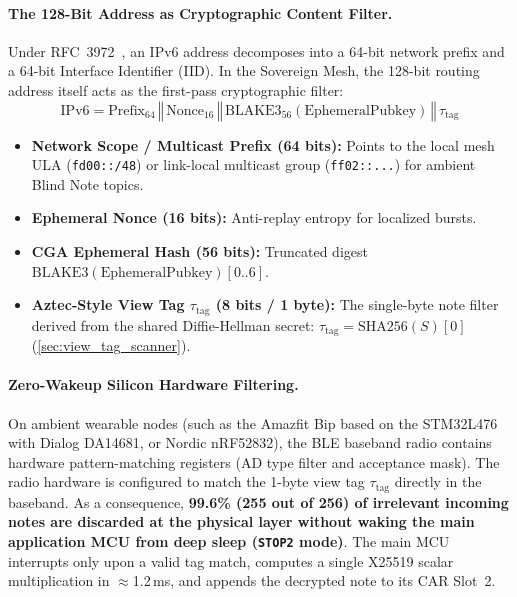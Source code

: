 \documentclass[a4paper,11pt,twoside,parskip=half-,headings=small]{scrartcl}
\newcommand{\code}[1]{\texttt{#1}}
\begin{document}
\paragraph{The 128-Bit Address as Cryptographic Content Filter.}
Under RFC~3972~\cite{rfc3972}, an IPv6 address decomposes into a 64-bit network prefix and a 64-bit Interface Identifier (IID). In the Sovereign Mesh, the 128-bit routing address itself acts as the first-pass cryptographic filter:
\begin{equation}
\text{IPv6} = \text{Prefix}_{64} \,\mathbin{\Vert}\, \text{Nonce}_{16} \,\mathbin{\Vert}\, \text{BLAKE3}_{56}(\text{EphemeralPubkey}) \,\mathbin{\Vert}\, \tau_{\text{tag}}
\end{equation}
\begin{itemize}[nosep]
  \item \textbf{Network Scope / Multicast Prefix (64 bits):} Points to the local mesh ULA (\code{fd00::/48}) or link-local multicast group (\code{ff02::...}) for ambient Blind Note topics.
  \item \textbf{Ephemeral Nonce (16 bits):} Anti-replay entropy for localized bursts.
  \item \textbf{CGA Ephemeral Hash (56 bits):} Truncated digest $\text{BLAKE3}(\text{EphemeralPubkey})[0..6]$.
  \item \textbf{Aztec-Style View Tag $\tau_{\text{tag}}$ (8 bits / 1 byte):} The single-byte note filter derived from the shared Diffie-Hellman secret: $\tau_{\text{tag}} = \text{SHA256}(S)[0]$ (\cref{sec:view_tag_scanner}).
\end{itemize}

\paragraph{Zero-Wakeup Silicon Hardware Filtering.}
On ambient wearable nodes (such as the Amazfit Bip based on the STM32L476 with Dialog DA14681, or Nordic nRF52832), the BLE baseband radio contains hardware pattern-matching registers (AD type filter and acceptance mask). The radio hardware is configured to match the 1-byte view tag $\tau_{\text{tag}}$ directly in the baseband. As a consequence, \textbf{99.6\% (255 out of 256) of irrelevant incoming notes are discarded at the physical layer without waking the main application MCU from deep sleep (\code{STOP2} mode)}. The main MCU interrupts only upon a valid tag match, computes a single X25519 scalar multiplication in $\approx$1.2\,ms, and appends the decrypted note to its CAR Slot~2.
\end{document}
